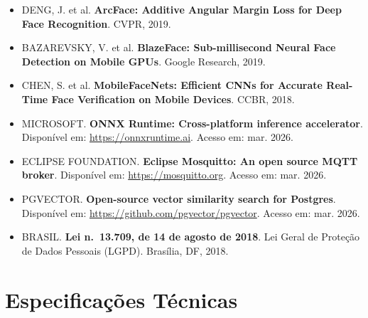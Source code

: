 \documentclass[12pt,a4paper]{report}
\begin{document}
\begin{itemize}
    \item DENG, J. et al. \textbf{ArcFace: Additive Angular Margin Loss for Deep Face Recognition}. CVPR, 2019.
    \item BAZAREVSKY, V. et al. \textbf{BlazeFace: Sub-millisecond Neural Face Detection on Mobile GPUs}. Google Research, 2019.
    \item CHEN, S. et al. \textbf{MobileFaceNets: Efficient CNNs for Accurate Real-Time Face Verification on Mobile Devices}. CCBR, 2018.
    \item MICROSOFT. \textbf{ONNX Runtime: Cross-platform inference accelerator}. Disponível em: \url{https://onnxruntime.ai}. Acesso em: mar. 2026.
    \item ECLIPSE FOUNDATION. \textbf{Eclipse Mosquitto: An open source MQTT broker}. Disponível em: \url{https://mosquitto.org}. Acesso em: mar. 2026.
    \item PGVECTOR. \textbf{Open-source vector similarity search for Postgres}. Disponível em: \url{https://github.com/pgvector/pgvector}. Acesso em: mar. 2026.
    \item BRASIL. \textbf{Lei n.\ 13.709, de 14 de agosto de 2018}. Lei Geral de Proteção de Dados Pessoais (LGPD). Brasília, DF, 2018.
\end{itemize}

\appendix

\chapter{Especificações Técnicas}
\end{document}

